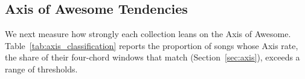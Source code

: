 \documentclass{article}
\begin{document}




\subsection{Axis of Awesome Tendencies}
\label{sec:axis_tendencies}


We next measure how strongly each collection leans on the Axis of Awesome. Table~\ref{tab:axis_classification} reports the proportion of songs whose Axis rate, the share of their four-chord windows that match (Section~\ref{sec:axis}), exceeds a range of thresholds.
\end{document}
